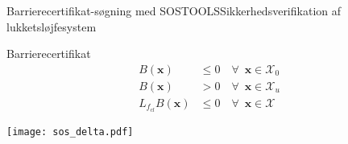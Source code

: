 \begin{frame}{Barrierecertifikat-søgning med SOSTOOLS}{Sikkerhedsverifikation af lukketsløjfesystem}
	\vspace{2mm}
\begin{minipage}[b]{0.35\linewidth}
	\begin{block}{Barrierecertifikat}
		\vspace{-5mm}
		\begin{align*}
		B(\mathbf{x})&\leq 0 \quad \forall\,\,\,\mathbf{x}\in\mathcal{X}_0\\
		B(\mathbf{x})&> 0 \quad \forall\,\,\,\mathbf{x}\in\mathcal{X}_u\\
		L_{f_{cl}}B(\mathbf{x})&\leq 0 \quad \forall\,\,\,\mathbf{x}\in\mathcal{X}
		\end{align*}
	\end{block}
\end{minipage}
\hspace{15mm}
\begin{minipage}[b]{0.4\linewidth}
\hspace{3mm}
\texttt{[image: sos\_delta.pdf]}
\end{minipage}


\end{frame}
